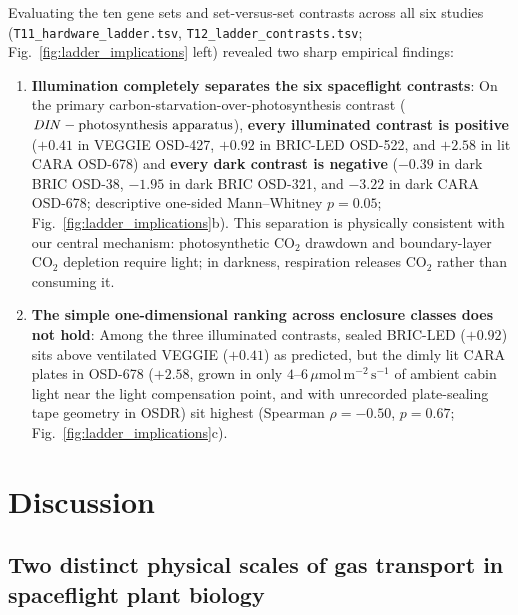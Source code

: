 \documentclass[preprint,11pt,numbers,sort&compress]{elsarticle}
\newcommand{\ums}{\ensuremath{\mu\mathrm{mol\,m^{-2}\,s^{-1}}}}
\begin{document}
Evaluating the ten gene sets and set-versus-set contrasts across all six studies (\texttt{T11\_hardware\_ladder.tsv}, \texttt{T12\_ladder\_contrasts.tsv}; Fig.~\ref{fig:ladder_implications} left) revealed two sharp empirical findings:
\begin{enumerate}
    \item \textbf{Illumination completely separates the six spaceflight contrasts}: On the primary carbon-starvation-over-photosynthesis contrast ($\text{\textit{DIN}} - \text{photosynthesis apparatus}$), \textbf{every illuminated contrast is positive} ($+0.41$ in VEGGIE OSD-427, $+0.92$ in BRIC-LED OSD-522, and $+2.58$ in lit CARA OSD-678) and \textbf{every dark contrast is negative} ($-0.39$ in dark BRIC OSD-38, $-1.95$ in dark BRIC OSD-321, and $-3.22$ in dark CARA OSD-678; descriptive one-sided Mann--Whitney $p = 0.05$; Fig.~\ref{fig:ladder_implications}b). This separation is physically consistent with our central mechanism: photosynthetic $\mathrm{CO_2}$ drawdown and boundary-layer $\mathrm{CO_2}$ depletion require light; in darkness, respiration releases $\mathrm{CO_2}$ rather than consuming it.
    \item \textbf{The simple one-dimensional ranking across enclosure classes does not hold}: Among the three illuminated contrasts, sealed BRIC-LED ($+0.92$) sits above ventilated VEGGIE ($+0.41$) as predicted, but the dimly lit CARA plates in OSD-678 ($+2.58$, grown in only $4\text{--}6\,\ums$ of ambient cabin light near the light compensation point, and with unrecorded plate-sealing tape geometry in OSDR) sit highest (Spearman $\rho = -0.50$, $p = 0.67$; Fig.~\ref{fig:ladder_implications}c).
\end{enumerate}

\section{Discussion}\label{sec:discussion}

\subsection{Two distinct physical scales of gas transport in spaceflight plant biology}
\end{document}
